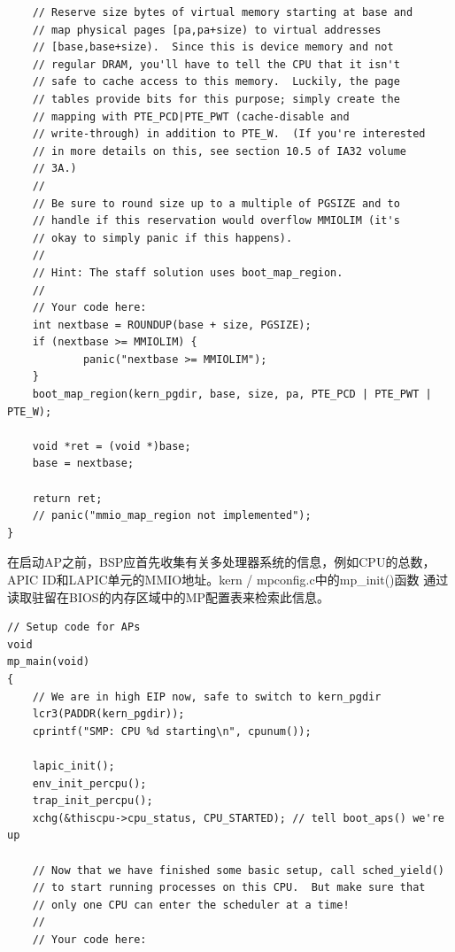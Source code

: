 \begin{ExerciseList}
\begin{verbatim}
    // Reserve size bytes of virtual memory starting at base and
    // map physical pages [pa,pa+size) to virtual addresses
    // [base,base+size).  Since this is device memory and not
    // regular DRAM, you'll have to tell the CPU that it isn't
    // safe to cache access to this memory.  Luckily, the page
    // tables provide bits for this purpose; simply create the
    // mapping with PTE_PCD|PTE_PWT (cache-disable and
    // write-through) in addition to PTE_W.  (If you're interested
    // in more details on this, see section 10.5 of IA32 volume
    // 3A.)
    //
    // Be sure to round size up to a multiple of PGSIZE and to
    // handle if this reservation would overflow MMIOLIM (it's
    // okay to simply panic if this happens).
    //
    // Hint: The staff solution uses boot_map_region.
    //
    // Your code here:
    int nextbase = ROUNDUP(base + size, PGSIZE);
    if (nextbase >= MMIOLIM) {
            panic("nextbase >= MMIOLIM");
    }
    boot_map_region(kern_pgdir, base, size, pa, PTE_PCD | PTE_PWT | PTE_W);

    void *ret = (void *)base;
    base = nextbase;

    return ret;
    // panic("mmio_map_region not implemented");
}
\end{verbatim}

在启动AP之前，BSP应首先收集有关多处理器系统的信息，例如CPU的总数，APIC ID和LAPIC单元的MMIO地址。kern / mpconfig.c中的mp\_init()函数 通过读取驻留在BIOS的内存区域中的MP配置表来检索此信息。


\begin{verbatim}
// Setup code for APs
void
mp_main(void)
{
    // We are in high EIP now, safe to switch to kern_pgdir
    lcr3(PADDR(kern_pgdir));
    cprintf("SMP: CPU %d starting\n", cpunum());

    lapic_init();
    env_init_percpu();
    trap_init_percpu();
    xchg(&thiscpu->cpu_status, CPU_STARTED); // tell boot_aps() we're up

    // Now that we have finished some basic setup, call sched_yield()
    // to start running processes on this CPU.  But make sure that
    // only one CPU can enter the scheduler at a time!
    //
    // Your code here:


\end{verbatim}
\end{ExerciseList}

